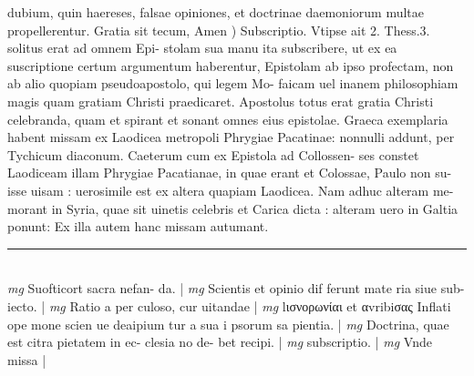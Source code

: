 \documentclass{article}
\begin{document}
\begin{pages}
dubium, quin haereses, falsae opiniones, et doctrinae daemoniorum multae propellerentur.  \pend\pstart Gratia sit tecum, Amen ) Subscriptio. Vtipse ait 2. Thess.3. solitus erat ad omnem Epi- stolam sua manu ita subscribere, ut ex ea suscriptione certum argumentum haberentur, Epistolam ab ipso profectam, non ab alio quopiam pseudoapostolo, qui legem Mo- faicam uel inanem philosophiam magis quam gratiam Christi praedicaret. Apostolus totus erat gratia Christi celebranda, quam et spirant et sonant omnes eius epistolae. Graeca exemplaria habent missam ex Laodicea metropoli Phrygiae Pacatinae: nonnulli addunt, per Tychicum diaconum. Caeterum cum ex Epistola ad Collossen- ses constet Laodiceam illam Phrygiae Pacatianae, in quae erant et Colossae, Paulo non su- isse uisam : uerosimile est ex altera quapiam Laodicea. Nam adhuc alteram me- morant in Syria, quae sit uinetis celebris et Carica dicta : alteram uero in Galtia ponunt: Ex illa autem hanc missam autumant.  \pend
\vspace{0.5cm}\noindent
\vspace{0.2cm}\rule{1cm}{0.2pt}\\ 
\hspace{0.2cm}\textit{mg}
\footnotesize Suofticort sacra nefan- da. 
\normalsize| 
\hspace{0.2cm}\textit{mg}
\footnotesize Scientis et opinio dif ferunt mate ria siue sub- iecto. 
\normalsize| 
\hspace{0.2cm}\textit{mg}
\footnotesize Ratio a per culoso, cur uitandae 
\normalsize| 
\hspace{0.2cm}\textit{mg}
\footnotesize lισνορωνίαι et αvribiσας Inflati ope mone scien ue deaipium tur a sua i psorum sa pientia. 
\normalsize| 
\hspace{0.2cm}\textit{mg}
\footnotesize Doctrina, quae est citra pietatem in ec- clesia no de- bet recipi. 
\normalsize| 
\hspace{0.2cm}\textit{mg}
\footnotesize subscriptio. 
\normalsize| 
\hspace{0.2cm}\textit{mg}
\footnotesize Vnde missa 
\normalsize| 
\endnumbering
\end{pages}
\end{document}
